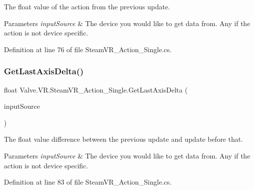 The float value of the action from the previous update. 


\begin{DoxyParams}{Parameters}
{\em input\+Source} & The device you would like to get data from. Any if the action is not device specific.\\
\hline
\end{DoxyParams}


Definition at line 76 of file Steam\+V\+R\+\_\+\+Action\+\_\+\+Single.\+cs.

\mbox{\label{class_valve_1_1_v_r_1_1_steam_v_r___action___single_a8732072fe03f7645b4087d20dce8df39}} 
\subsubsection{\texorpdfstring{GetLastAxisDelta()}{GetLastAxisDelta()}}
{\footnotesize\ttfamily float Valve.\+V\+R.\+Steam\+V\+R\+\_\+\+Action\+\_\+\+Single.\+Get\+Last\+Axis\+Delta (\begin{DoxyParamCaption}\item[{\mbox{\hyperlink{namespace_valve_1_1_v_r_a82e5bf501cc3aa155444ee3f0662853f}{Steam\+V\+R\+\_\+\+Input\+\_\+\+Sources}}}]{input\+Source }\end{DoxyParamCaption})}



The float value difference between the previous update and update before that. 


\begin{DoxyParams}{Parameters}
{\em input\+Source} & The device you would like to get data from. Any if the action is not device specific.\\
\hline
\end{DoxyParams}


Definition at line 83 of file Steam\+V\+R\+\_\+\+Action\+\_\+\+Single.\+cs.

\mbox{\label{class_valve_1_1_v_r_1_1_steam_v_r___action___single_ae17685502cf60155bf806900ee0f197e}} 
